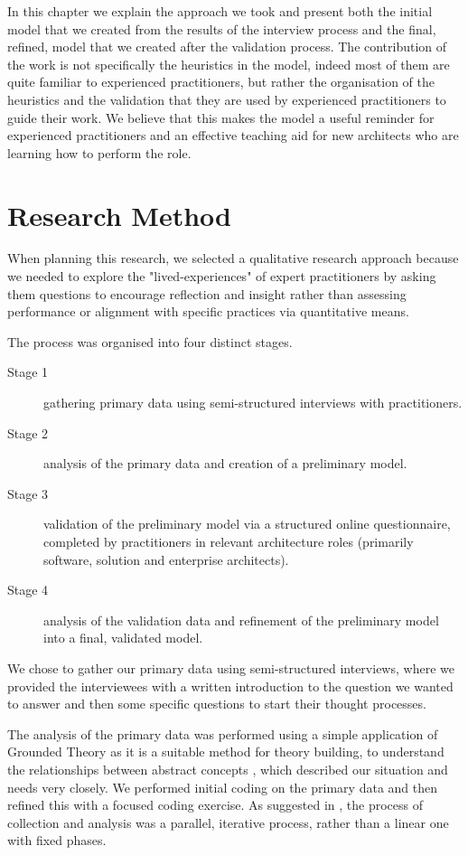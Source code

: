In this chapter we explain the approach we took and present both the initial model that we created from the results of the interview process and the final, refined, model that we created after the validation process.  The contribution of the work is not specifically the heuristics in the model, indeed most of them are quite familiar to experienced practitioners, but rather the organisation of the heuristics and the validation that they are used by experienced practitioners to guide their work.  We believe that this makes the model a useful reminder for experienced practitioners and an effective teaching aid for new architects who are learning how to perform the role.

\section{Research Method}

When planning this research, we selected a qualitative research approach because we needed to explore the "lived-experiences" of expert practitioners by asking them questions to encourage reflection and insight \cite{lapan2012-qualitativeresearch} rather than assessing performance or alignment with specific practices via quantitative means.

The process was organised into four distinct stages.

\begin{description}
	\item [Stage 1] gathering primary data using semi-structured interviews with practitioners.
	\item [Stage 2] analysis of the primary data and creation of a preliminary model.
	\item [Stage 3] validation of the preliminary model via a structured online questionnaire, completed by practitioners in relevant architecture roles (primarily software, solution and enterprise architects).
	\item [Stage 4] analysis of the validation data and refinement of the preliminary model into a final, validated model.
\end{description}

We chose to gather our primary data using semi-structured interviews, where we provided the interviewees with a written introduction to the question we wanted to answer and then some specific questions to start their thought processes. 

The analysis of the primary data was performed using a simple application of Grounded Theory as it is a suitable method for theory building, to understand the relationships between abstract concepts \cite{charmaz2006-groundedtheory}, which described our situation and needs very closely.  We performed initial coding on the primary data and then refined this with a focused coding exercise.  As suggested in \cite{lapan2012-qualitativeresearch}, the process of collection and analysis was a parallel, iterative process, rather than a linear one with fixed phases.  

